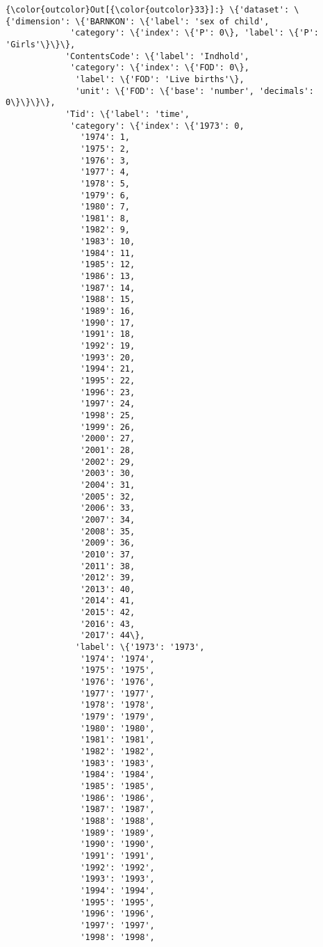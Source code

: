 \documentclass[11pt]{article}
\begin{document}
\begin{Verbatim}[commandchars=\\\{\}]
{\color{outcolor}Out[{\color{outcolor}33}]:} \{'dataset': \{'dimension': \{'BARNKON': \{'label': 'sex of child',
             'category': \{'index': \{'P': 0\}, 'label': \{'P': 'Girls'\}\}\},
            'ContentsCode': \{'label': 'Indhold',
             'category': \{'index': \{'FOD': 0\},
              'label': \{'FOD': 'Live births'\},
              'unit': \{'FOD': \{'base': 'number', 'decimals': 0\}\}\}\},
            'Tid': \{'label': 'time',
             'category': \{'index': \{'1973': 0,
               '1974': 1,
               '1975': 2,
               '1976': 3,
               '1977': 4,
               '1978': 5,
               '1979': 6,
               '1980': 7,
               '1981': 8,
               '1982': 9,
               '1983': 10,
               '1984': 11,
               '1985': 12,
               '1986': 13,
               '1987': 14,
               '1988': 15,
               '1989': 16,
               '1990': 17,
               '1991': 18,
               '1992': 19,
               '1993': 20,
               '1994': 21,
               '1995': 22,
               '1996': 23,
               '1997': 24,
               '1998': 25,
               '1999': 26,
               '2000': 27,
               '2001': 28,
               '2002': 29,
               '2003': 30,
               '2004': 31,
               '2005': 32,
               '2006': 33,
               '2007': 34,
               '2008': 35,
               '2009': 36,
               '2010': 37,
               '2011': 38,
               '2012': 39,
               '2013': 40,
               '2014': 41,
               '2015': 42,
               '2016': 43,
               '2017': 44\},
              'label': \{'1973': '1973',
               '1974': '1974',
               '1975': '1975',
               '1976': '1976',
               '1977': '1977',
               '1978': '1978',
               '1979': '1979',
               '1980': '1980',
               '1981': '1981',
               '1982': '1982',
               '1983': '1983',
               '1984': '1984',
               '1985': '1985',
               '1986': '1986',
               '1987': '1987',
               '1988': '1988',
               '1989': '1989',
               '1990': '1990',
               '1991': '1991',
               '1992': '1992',
               '1993': '1993',
               '1994': '1994',
               '1995': '1995',
               '1996': '1996',
               '1997': '1997',
               '1998': '1998',

\end{Verbatim}
\end{document}
